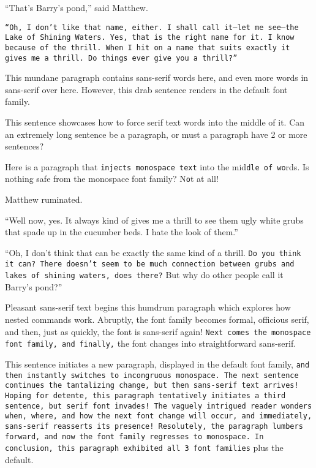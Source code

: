 \documentclass[a4paper]{article}
\begin{document}
\textrm{``That's Barry's pond,'' said Matthew.}

\texttt{``Oh, I don't like that name, either. I shall call it---let me see---the Lake of Shining Waters. Yes, that is the right name for it. I know because of the thrill. When I hit on a name that suits exactly it gives me a thrill. Do things ever give you a thrill?''}

This mundane paragraph contains \textsf{sans-serif} words here, and even more \textsf{words in sans-serif over here}. However, this drab sentence renders in the default font family.

This sentence showcases \textrm{how to force serif text words} into the middle of it. Can an extremely long sentence be a paragraph, or must a paragraph have 2 or more sentences?

Here is a paragraph that \texttt{injects monospace text} into the mid\texttt{dle of wo}rds. Is nothing safe from the monospace font family? N\texttt{o}t at all!

Matthew \textsf{ruminated.}

``Well now, yes. \textrm{It always kind of gives me a thrill to see them ugly white grubs that spade up in the cucumber beds.} I hate the look of them.''

``Oh, I don't think that can be exactly the same kind of a thrill. \texttt{Do you think it can? There doesn't seem to be much connection between grubs and lakes of shining waters, does there?} But why do other people call it Barry's pond?''

\textsf{Pleasant sans-serif text begins this humdrum paragraph which explores how nested commands work. \textrm{Abruptly, the font family becomes formal, officious serif,} and then, just as quickly, the font is sans-serif again! \texttt{Next comes the monospace font family, and finally,} the font changes into straightforward sans-serif.}

This sentence initiates a new paragraph, displayed in the default font family, \texttt{and then instantly switches to incongruous monospace. The next sentence continues the tantalizing change, \textsf{but then sans-serif text arrives! Hoping for detente, this paragraph tentatively initiates a third sentence, \textrm{but serif font invades! The vaguely intrigued reader wonders when, where, and how the next font change will occur,} and immediately, sans-serif reasserts its presence! Resolutely, the paragraph lumbers forward, and} now the font family regresses to monospace. In conclusion, this paragraph exhibited all 3 font families} plus the default.
\end{document}
